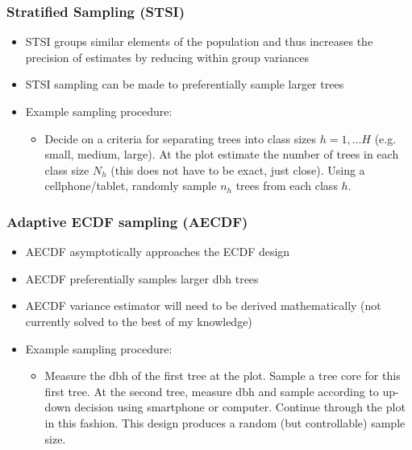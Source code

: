 \documentclass{beamer}
\begin{document}
%
\begin{frame}
  \frametitle{Stratified Sampling (STSI)}
  \begin{itemize}
    \item STSI groups similar elements of the population and thus increases the precision of estimates by reducing within group variances \vspace{3mm}
    \item STSI sampling can be made to preferentially sample larger trees \vspace{3mm}
    \item Example sampling procedure: \vspace{3mm}
    \begin{itemize}
      \item Decide on a criteria for separating trees into class sizes $h = 1, \ldots H$ (e.g. small, medium, large). At the plot estimate the number of trees in each class size $N_h$ (this does not have to be exact, just close). Using a cellphone/tablet, randomly sample $n_h$ trees from each class $h$. 
    \end{itemize}
  \end{itemize}
\end{frame} 
%
\begin{frame}
  \frametitle{Adaptive ECDF sampling (AECDF)}
  \begin{itemize}
    \item AECDF asymptotically approaches the ECDF design \vspace{3mm}
    \item AECDF preferentially samples larger dbh trees \vspace{3mm}
    \item AECDF variance estimator will need to be derived mathematically (not currently solved to the best of my knowledge) \vspace{3mm}
    \item Example sampling procedure: \vspace{3mm}
    \begin{itemize}
      \item Measure the dbh of the first tree at the plot. Sample a tree core for this first tree. At the second tree, measure dbh and sample according to up-down decision using smartphone or computer. Continue through the plot in this fashion. This design produces a random (but controllable) sample size.
    \end{itemize}
  \end{itemize}
\end{frame}
\end{document}
